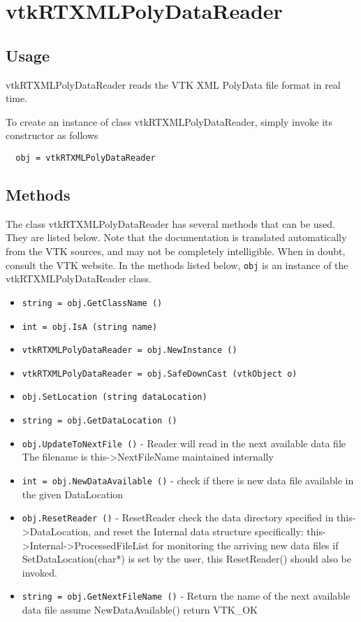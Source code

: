 \section{vtkRTXMLPolyDataReader}

\subsection{Usage}

 vtkRTXMLPolyDataReader reads the VTK XML PolyData file format in real time.  

To create an instance of class vtkRTXMLPolyDataReader, simply
invoke its constructor as follows
\begin{verbatim}
  obj = vtkRTXMLPolyDataReader
\end{verbatim}
\subsection{Methods}

The class vtkRTXMLPolyDataReader has several methods that can be used.
  They are listed below.
Note that the documentation is translated automatically from the VTK sources,
and may not be completely intelligible.  When in doubt, consult the VTK website.
In the methods listed below, \verb|obj| is an instance of the vtkRTXMLPolyDataReader class.
\begin{itemize}
\item  \verb|string = obj.GetClassName ()|

\item  \verb|int = obj.IsA (string name)|

\item  \verb|vtkRTXMLPolyDataReader = obj.NewInstance ()|

\item  \verb|vtkRTXMLPolyDataReader = obj.SafeDownCast (vtkObject o)|

\item  \verb|obj.SetLocation (string dataLocation)|

\item  \verb|string = obj.GetDataLocation ()|

\item  \verb|obj.UpdateToNextFile ()| -  Reader will read in the next available data file
 The filename is this->NextFileName maintained internally 

\item  \verb|int = obj.NewDataAvailable ()| -  check if there is new data file available in the 
 given DataLocation

\item  \verb|obj.ResetReader ()| -  ResetReader check the data directory specified in 
 this->DataLocation, and reset the Internal data structure
 specifically: this->Internal->ProcessedFileList
 for monitoring the arriving new data files
 if SetDataLocation(char*) is set by the user, 
 this ResetReader() should also be invoked. 

\item  \verb|string = obj.GetNextFileName ()| -  Return the name of the next available data file
 assume NewDataAvailable() return VTK\_OK

\end{itemize}
